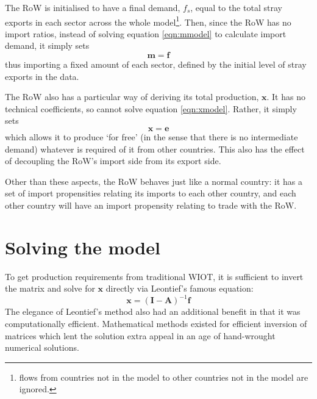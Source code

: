 \documentclass[a4paper]{article}
\begin{document}
The RoW is initialised to have a final demand, $f_s$, equal to the total stray exports in each sector across the whole model\footnote{flows from countries not in the model to other countries not in the model are ignored.}. Then, since the RoW has no import ratios, instead of solving equation \eqref{eqn:mmodel} to calculate import demand, it simply sets
\begin{equation}\label{eqn:RoW_imports}
\boldsymbol{m} = \boldsymbol{f}
\end{equation}
thus importing a fixed amount of each sector, defined by the initial level of stray exports in the data.

The RoW also has a particular way of deriving its total production, $\boldsymbol{x}$. It has no technical coefficients, so cannot solve equation \eqref{eqn:xmodel}. Rather, it simply sets
\begin{equation}\label{eqn:RoW_total_production}
\boldsymbol{x} = \boldsymbol{e}
\end{equation}
which allows it to produce `for free' (in the sense that there is no intermediate demand) whatever is required of it from other countries. This also has the effect of decoupling the RoW's import side from its export side.

Other than these aspects, the RoW behaves just like a normal country: it has a set of import propensities relating its imports to each other country, and each other country will have an import propensity relating to trade with the RoW.

\section{Solving the model}\label{sec:algorithm}
To get production requirements from traditional WIOT, it is sufficient to invert the matrix and solve for $\boldsymbol{x}$ directly via Leontief's famous equation:
\begin{equation}
\boldsymbol{x} = (\boldsymbol{I}- \boldsymbol{A})^{-1}\boldsymbol{f}
\end{equation}
The elegance of Leontief's method also had an additional benefit in that it was computationally efficient.
Mathematical methods existed for efficient inversion of matrices which lent the solution extra appeal in an age of hand-wrought numerical solutions.
\end{document}
